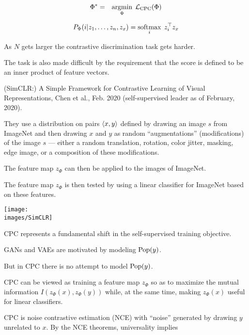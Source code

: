 {

\begin{eqnarray*}
\Phi^*  & = & \operatorname*{argmin}_\Phi\;{\cal L}_\mathrm{CPC}(\Phi)
\end{eqnarray*}

\vfill
$$P_\Phi(i|z_1,\ldots,z_n,z_x) = \operatorname*{softmax}_i\;z_i^\top z_x$$

\vfill
As $N$ gets larger the contrastive discrimination task gets harder.

\vfill
The task is also made difficult by the requirement that the score is defined to be an inner product of feature vectors.


(SimCLR:) A Simple Framework for Contrastive Learning of Visual Representations, Chen et al., Feb. 2020 (self-supervised leader as of February, 2020).

\vfill
They use a distribution on pairs ${\mbox{$\langle x,y\rangle$}}$ defined by drawing an image $s$ from ImageNet and then drawing $x$ and $y$ as random ``augmentations'' (modifications) of the image $s$
--- either a random translation, rotation, color jitter, masking, edge image, or a composition of these modifications.


The feature map $z_\Phi$ can then be applied to the images of ImageNet.

\vfill
The feature map $z_\Phi$ is then tested by using a {\color{red} linear} classifier for ImageNet based on these features.


\centerline{\texttt{[image: \\images/SimCLR]}}


CPC represents a fundamental shift in the self-supervised training objective.

\vfill
GANs and VAEs are motivated by modeling $\mathrm{Pop}(y)$.

\vfill
But in CPC there is no attempt to model $\mathrm{Pop}(y)$.

\vfill
CPC can be viewed as training a feature map $z_\Phi$ so as to maximize the mutual information {\color{red} $I(z_\Phi(x),z_\Phi(y))$} while, at the same time, making $z_\Phi(x)$ useful
for linear classifiers.


CPC is noise contrastive estimation (NCE) with ``noise'' generated by drawing $y$ unrelated to $x$.
By the NCE theorems, universality implies

}

